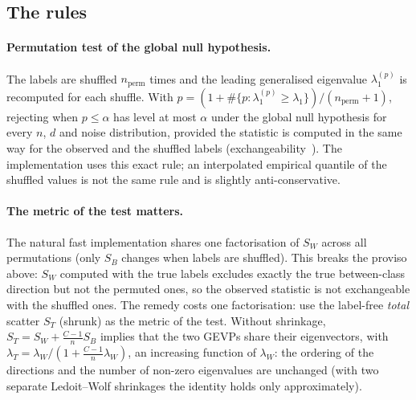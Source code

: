 \documentclass[11pt,a4paper]{article}
\theoremstyle{plain}
\theoremstyle{definition}
\theoremstyle{remark}
\begin{document}
\subsection{The rules}
\paragraph{Permutation test of the global null hypothesis.} The labels are
shuffled $n_{\mathrm{perm}}$ times and the leading generalised eigenvalue
$\lambda^{(p)}_1$ is recomputed for each shuffle. With
$p=(1+\#\{p:\lambda^{(p)}_1\ge\lambda_1\})/(n_{\mathrm{perm}}+1)$, rejecting
when $p\le\alpha$ has level at most $\alpha$ under the global null
hypothesis for every $n$, $d$ and noise distribution, provided the
statistic is computed in the same way for the observed and the shuffled
labels (exchangeability~\cite{phipson2010}). The implementation uses this
exact rule; an interpolated empirical quantile of the shuffled values is
not the same rule and is slightly anti-conservative.

\paragraph{The metric of the test matters.} The natural fast implementation
shares one factorisation of $S_W$ across all permutations (only $S_B$
changes when labels are shuffled). This breaks the proviso above: $S_W$
computed with the true labels excludes exactly the true between-class
direction but not the permuted ones, so the observed statistic is not
exchangeable with the shuffled ones. The remedy costs one factorisation:
use the label-free \emph{total} scatter $S_T$ (shrunk) as the metric of the
test. Without shrinkage, $S_T=S_W+\tfrac{C-1}{n}S_B$ implies that the two
GEVPs share their eigenvectors, with
$\lambda_T=\lambda_W/(1+\tfrac{C-1}{n}\lambda_W)$, an increasing function
of $\lambda_W$: the ordering of the directions and the number of non-zero
eigenvalues are unchanged (with two separate Ledoit--Wolf shrinkages the
identity holds only approximately).
\end{document}
